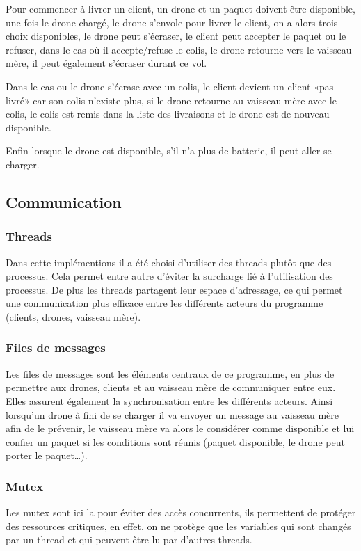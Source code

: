 \documentclass[article, backcover, french, nodocumentinfo]{upmethodology-document}
\begin{document}
			Pour commencer à livrer un client, un drone et un paquet doivent être
			disponible, une fois le drone chargé, le drone s'envole pour livrer le
			client, on a alors trois choix disponibles, le drone peut s'écraser, le
			client peut accepter le paquet ou le refuser, dans le cas où il accepte/refuse le
			colis, le drone retourne vers le vaisseau mère, il peut également s'écraser
			durant ce vol.

			Dans le cas ou le drone s'écrase avec un colis, le client
			devient un client «pas livré» car son colis n'existe plus, si le drone
			retourne au vaisseau mère avec le colis, le colis est remis dans la liste
			des livraisons et le drone est de nouveau disponible.

			Enfin lorsque le drone est disponible, s'il n'a plus de batterie, il peut
			aller se charger.
		\subsection{Communication}
			\subsubsection{Threads}
				Dans cette implémentions il a été choisi d'utiliser des threads plutôt que des processus.
				Cela permet entre autre d'éviter la surcharge lié à l'utilisation des processus.
				De plus les threads partagent leur espace d'adressage, ce qui permet une communication
				plus efficace entre les différents acteurs du programme (clients, drones, vaisseau mère).
			\subsubsection{Files de messages}
				Les files de messages sont les éléments centraux de ce programme, en plus de permettre aux drones,
				clients et au vaisseau mère de communiquer entre eux. Elles assurent également la synchronisation entre
				les différents acteurs. Ainsi lorsqu'un drone à fini de se charger il va envoyer un message au vaisseau
				mère afin de le prévenir, le vaisseau mère va alors le considérer comme disponible et lui confier un paquet
				si les conditions sont réunis (paquet disponible, le drone peut porter le paquet\ldots).
			\subsubsection{Mutex}
				Les mutex sont ici la pour éviter des accès concurrents, ils permettent de protéger des ressources critiques,
				en effet, on ne protège que les variables qui sont changés par un thread et qui peuvent être lu par d'autres threads.
\end{document}
